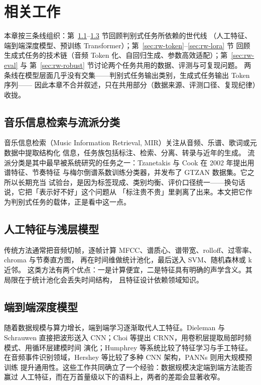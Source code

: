\documentclass[UTF8,10pt,a4paper]{ctexart}
\begin{document}
\section{相关工作}\label{sec:related}

本章按三条线组织：第~\ref{sec:rw-mir}--\ref{sec:rw-e2e} 节回顾判别式任务所依赖的世代线
（人工特征、端到端深度模型、预训练 Transformer）；第~\ref{sec:rw-token}--\ref{sec:rw-lora} 节
回顾生成式任务的技术链（音频 Token 化、自回归生成、参数高效适配）；第~\ref{sec:rw-eval} 与
第~\ref{sec:rw-robust} 节讨论两个任务共用的数据、评测与可复现问题。
两条线在模型层面几乎没有交集——判别式任务输出类别，生成式任务输出 Token 序列——
因此本章不合并叙述，只在共用部分（数据来源、评测口径、复现纪律）收拢。

\subsection{音乐信息检索与流派分类}\label{sec:rw-mir}

音乐信息检索（Music Information Retrieval, MIR）关注从音频、乐谱、歌词或元数据中提取结构化
信息\cite{downie2003mir,casey2008content}，任务族包括标注、检索、分离、转录与近年的生成。
流派分类是其中最早被系统研究的任务之一：Tzanetakis 与 Cook 在 2002 年提出用谱特征、节奏特征
与梅尔倒谱系数训练分类器，并发布了 GTZAN 数据集\cite{tzanetakis2002gtzan}。它之所以长期充当
试验台，是因为标签现成、类别均衡、评价口径统一——换句话说，它把「表示好不好」这个问题从
「标注贵不贵」里剥离了出来。本文把它作为判别式任务的载体，正是看中这一点。

\subsection{人工特征与浅层模型}

传统方法通常把音频切帧，逐帧计算 MFCC、谱质心、谱带宽、rolloff、过零率、chroma 与节奏直方图，
再在时间维做统计池化，最后送入 SVM、随机森林或 k 近邻\cite{tzanetakis2002gtzan,bogdanov2013essentia}。
这类方法有两个优点：一是计算便宜，二是特征具有明确的声学含义。其局限在于统计池化会丢失时间结构，
且特征设计依赖领域知识。

\subsection{端到端深度模型}\label{sec:rw-e2e}

随着数据规模与算力增长，端到端学习逐渐取代人工特征。Dieleman 与 Schrauwen 直接把波形送入
CNN\cite{dieleman2014endtoend}；Choi 等提出 CRNN，用卷积层提取局部时频模式、用循环层建模时间
演化\cite{choi2017crnn}；Humphrey 等系统比较了特征学习与手工特征\cite{humphrey2013feature}。
在音频事件识别领域，Hershey 等比较了多种 CNN 架构\cite{hershey2017cnn}，PANNs 则用大规模预训练
提升通用性\cite{kong2020panns}。这些工作共同确立了一个经验：数据规模决定端到端方法能否赢过
人工特征，而在万首量级以下的语料上，两者的差距会显著收窄。
\end{document}

